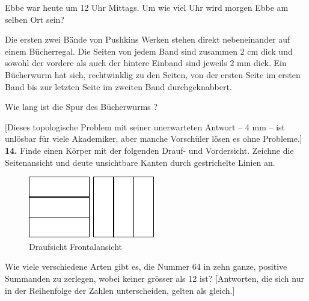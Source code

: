 \documentclass[12pt]{article} %
\begin{document}
 Ebbe war heute um 12 Uhr Mittags. Um wie viel Uhr wird morgen Ebbe am selben Ort sein?
\newline\newline\quad


 Die ersten zwei Bände von Pushkins Werken stehen direkt nebeneinander auf einem Bücherregal. Die Seiten von jedem Band sind zusammen 2 cm dick und sowohl der vordere als auch der hintere Einband sind jeweils 2 mm dick. Ein Bücherwurm hat sich, rechtwinklig zu den Seiten, von der ersten Seite im ersten Band bis zur letzten Seite im zweiten Band durchgeknabbert. 

Wie lang ist die Spur des Bücherwurms ?

[Dieses topologische Problem mit seiner unerwarteten Antwort -- 4 mm -- ist unlösbar für viele Akademiker, aber manche Vorschüler lösen es ohne Probleme.]
\newline\newline\quad
{\bf 14.} Finde einen Körper mit der folgenden Drauf- und Vordersicht. Zeichne die Seitenansicht  und deute unsichtbare Kanten durch gestrichelte Linien an. 
\begin{figure}[h]
\centering
\footnotesize
\includegraphics[scale=1]{taskbook-99} \qquad\qquad
\includegraphics[scale=1]{taskbook-98}
\\[2pt]
\hspace{1pt} 
Draufsicht
\hspace{43pt} Frontalansicht
\end{figure}
\newline\quad
{} Wie viele verschiedene Arten gibt es, die Nummer 64 in zehn ganze, positive Summanden zu zerlegen, wobei keiner grösser als 12 ist?
[Antworten, die sich nur in der Reihenfolge der Zahlen unterscheiden, gelten als gleich.]
\newline\newline\quad
\end{document}
